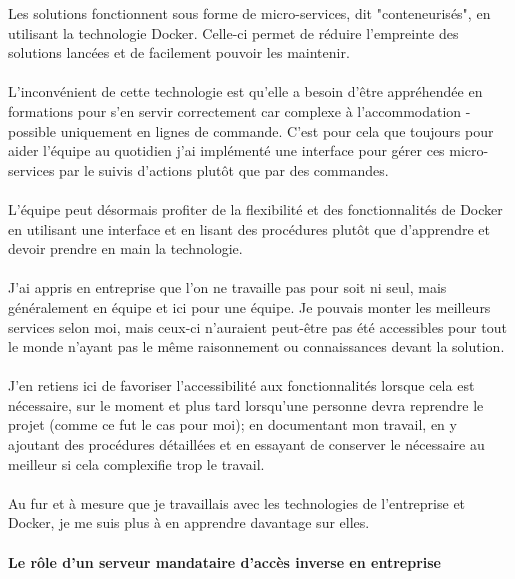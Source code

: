 \begin{sloppypar}
Les solutions fonctionnent sous forme de micro-services, dit "conteneurisés", en utilisant la technologie Docker. Celle-ci permet de réduire l'empreinte des solutions lancées et de facilement pouvoir les maintenir.%
\\ \\
L'inconvénient de cette technologie est qu'elle a besoin d'être appréhendée en formations pour s'en servir correctement car complexe à l'accommodation - possible uniquement en lignes de commande. C'est pour cela que toujours pour aider l'équipe au quotidien j'ai implémenté une interface pour gérer ces micro-services par le suivis d'actions plutôt que par des commandes.
\\ \\
L'équipe peut désormais profiter de la flexibilité et des fonctionnalités de Docker en utilisant une interface et en lisant des procédures plutôt que d'apprendre et devoir prendre en main la technologie.
\\ \\
J'ai appris en entreprise que l'on ne travaille pas pour soit ni seul, mais généralement en équipe et ici pour une équipe. Je pouvais monter les meilleurs services selon moi, mais ceux-ci n'auraient peut-être pas été accessibles pour tout le monde n'ayant pas le même raisonnement ou connaissances devant la solution.
\\ \\
J'en retiens ici de favoriser l'accessibilité aux fonctionnalités lorsque cela est nécessaire, sur le moment et plus tard lorsqu'une personne devra reprendre le projet (comme ce fut le cas pour moi); en documentant mon travail, en y ajoutant des procédures détaillées et en essayant de conserver le nécessaire au meilleur si cela complexifie trop le travail.
\\ \\
Au fur et à mesure que je travaillais avec les technologies de l'entreprise et Docker, je me suis plus à en apprendre davantage sur elles.

\paragraph{Le rôle d'un serveur mandataire d'accès inverse en entreprise}


\end{sloppypar}
